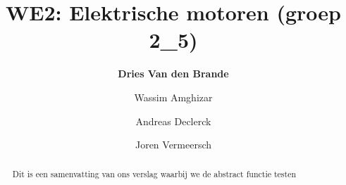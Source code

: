 \documentclass[12pt]{article}
\title{WE2: Elektrische motoren (groep 2\_5)}
\author{\textbf{Dries Van den Brande} \and Wassim Amghizar 
\and Andreas Declerck \and Joren Vermeersch}
\begin{document}
\maketitle

\begin{abstract}
    Dit is een samenvatting van ons verslag waarbij we de abstract functie testen
\end{abstract}
\tableofcontents
















\end{document}
